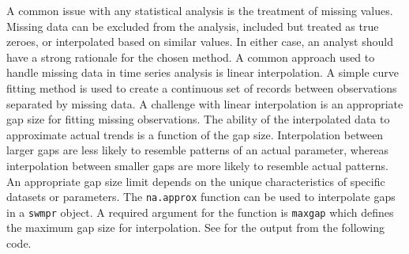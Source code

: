 \documentclass[10pt,letterpaper]{article}\usepackage[]{graphicx}\usepackage[]{color}
\begin{document}
A common issue with any statistical analysis is the treatment of missing values.  Missing data can be excluded from the analysis, included but treated as true zeroes, or interpolated based on similar values.  In either case, an analyst should have a strong rationale for the chosen method.  A common approach used to handle missing data in time series analysis is linear interpolation.  A simple curve fitting method is used to create a continuous set of records between observations separated by missing data.  A challenge with linear interpolation is an appropriate gap size for fitting missing observations.  The ability of the interpolated data to approximate actual trends is a function of the gap size.  Interpolation between larger gaps are less likely to resemble patterns of an actual parameter, whereas interpolation between smaller gaps are more likely to resemble actual patterns.  An appropriate gap size limit depends on the unique characteristics of specific datasets or parameters.  The \texttt{na.approx} function can be used to interpolate gaps in a \texttt{swmpr} object.  A required argument for the function is \texttt{maxgap} which defines the maximum gap size for interpolation.  See  for the output from the following code.
\end{document}
